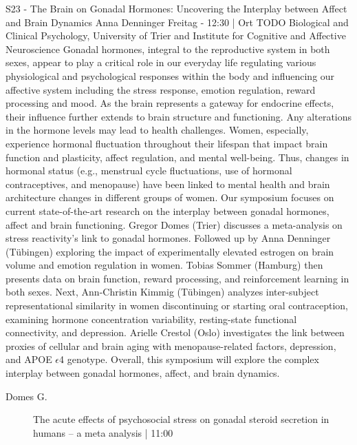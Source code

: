 
            \begin{symposium}
            {S23 - The Brain on Gonadal Hormones: Uncovering the Interplay between Affect and Brain Dynamics}
            {Anna Denninger}
            {Freitag  - 12:30 | Ort TODO}
            {Biological and Clinical Psychology, University of Trier and Institute for Cognitive and Affective Neuroscience}
            Gonadal hormones, integral to the reproductive system in both sexes, appear to play a critical role in our everyday life regulating various physiological and psychological responses within the body and influencing our affective system including the stress response, emotion regulation, reward processing and mood. As the brain represents a gateway for endocrine effects, their influence further extends to brain structure and functioning. Any alterations in the hormone levels may lead to health challenges. Women, especially, experience hormonal fluctuation throughout their lifespan that impact brain function and plasticity, affect regulation, and mental well-being. Thus, changes in hormonal status (e.g., menstrual cycle fluctuations, use of hormonal contraceptives, and menopause) have been linked to mental health and brain architecture changes in different groups of women. Our symposium focuses on current state-of-the-art research on the interplay between gonadal hormones, affect and brain functioning. Gregor Domes (Trier) discusses a meta-analysis on stress reactivity’s link to gonadal hormones. Followed up by Anna Denninger (Tübingen) exploring the impact of experimentally elevated estrogen on brain volume and emotion regulation in women. Tobias Sommer (Hamburg) then presents data on brain function, reward processing, and reinforcement learning in both sexes. Next, Ann-Christin Kimmig (Tübingen) analyzes inter-subject representational similarity in women discontinuing or starting oral contraception, examining hormone concentration variability, resting-state functional connectivity, and depression. Arielle Crestol (Oslo) investigates the link between proxies of cellular and brain aging with menopause-related factors, depression, and APOE $\epsilon$4 genotype. Overall, this symposium will explore the complex interplay between gonadal hormones, affect, and brain dynamics.
            \begin{description}    
            
                \item [ Domes G.] The acute effects of psychosocial stress on gonadal steroid secretion in humans – a meta analysis \textcolor{mygray}{ | 11:00}    
                

\end{description}
\end{symposium}
